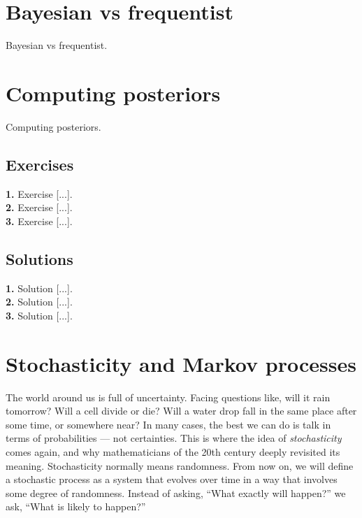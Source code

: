 \documentclass{book}
\begin{document}
\newpage

\section{Bayesian vs frequentist}
Bayesian vs frequentist.

\newpage

\section{Computing posteriors}
Computing posteriors.

\subsection*{Exercises}

\textbf{1.} Exercise [...].\\

\textbf{2.} Exercise [...].\\

\textbf{3.} Exercise [...].\\

\newpage

\subsection*{Solutions}

\textbf{1.} Solution [...].\\

\textbf{2.} Solution [...].\\

\textbf{3.} Solution [...].\\

\section{Stochasticity and Markov processes}

The world around us is full of uncertainty. Facing questions like, will it rain tomorrow? Will a cell divide or die? Will a water drop fall in the same place after some time, or somewhere near? In many cases, the best we can do is talk in terms of probabilities — not certainties. This is where the idea of \textit{stochasticity} comes again, and why mathematicians of the 20th century deeply revisited its meaning. Stochasticity normally means randomness. From now on, we will define a stochastic process as a system that evolves over time in a way that involves some degree of randomness. Instead of asking, “What exactly will happen?” we ask, “What is likely to happen?”\\
\end{document}
